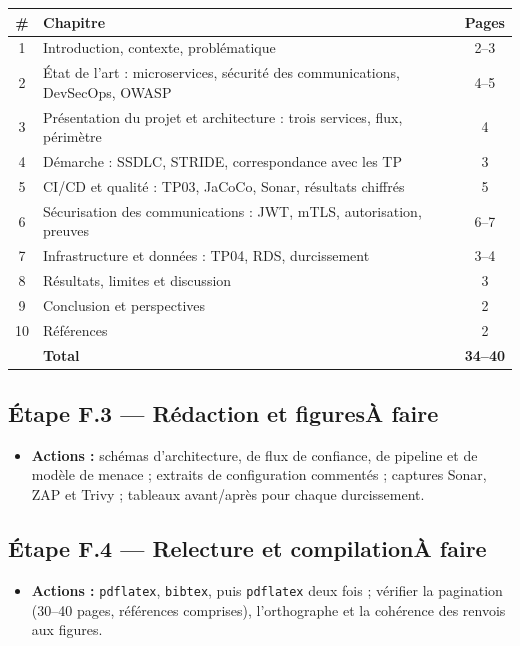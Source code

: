 \documentclass[12pt,a4paper]{article}
\newcommand{\code}[1]{\texttt{\small #1}}
\newcommand{\fait}{\hfill\textcolor{green!45!black}{\small\textbf{Fait}}}
\newcommand{\afaire}{\hfill\textcolor{orange!80!black}{\small\textbf{\`A faire}}}
\newcommand{\etape}[2]{%
  \subsection*{#1\ifstrequal{#2}{f}{\fait}{\afaire}}%
}
\begin{document}
\begin{center}
\small
\begin{tabularx}{\textwidth}{@{}cXc@{}}
\toprule
\textbf{\#} & \textbf{Chapitre} & \textbf{Pages} \\
\midrule
1 & Introduction, contexte, probl\'ematique & 2--3 \\
2 & \'Etat de l'art : microservices, s\'ecurit\'e des communications, DevSecOps, OWASP & 4--5 \\
3 & Pr\'esentation du projet et architecture : trois services, flux, p\'erim\`etre & 4 \\
4 & D\'emarche : SSDLC, STRIDE, correspondance avec les TP & 3 \\
5 & CI/CD et qualit\'e : TP03, JaCoCo, Sonar, r\'esultats chiffr\'es & 5 \\
6 & S\'ecurisation des communications : JWT, mTLS, autorisation, preuves & 6--7 \\
7 & Infrastructure et donn\'ees : TP04, RDS, durcissement & 3--4 \\
8 & R\'esultats, limites et discussion & 3 \\
9 & Conclusion et perspectives & 2 \\
10 & R\'ef\'erences & 2 \\
\midrule
 & \textbf{Total} & \textbf{34--40} \\
\bottomrule
\end{tabularx}
\end{center}

\etape{\'Etape F.3 --- R\'edaction et figures}{a}
\begin{itemize}[leftmargin=1.4em,itemsep=0.1em]
  \item \textbf{Actions :} sch\'emas d'architecture, de flux de confiance, de pipeline et de
        mod\`ele de menace ; extraits de configuration comment\'es ; captures Sonar, ZAP et
        Trivy ; tableaux avant/apr\`es pour chaque durcissement.
\end{itemize}

\etape{\'Etape F.4 --- Relecture et compilation}{a}
\begin{itemize}[leftmargin=1.4em,itemsep=0.1em]
  \item \textbf{Actions :} \code{pdflatex}, \code{bibtex}, puis \code{pdflatex} deux fois ;
        v\'erifier la pagination (30--40 pages, r\'ef\'erences comprises), l'orthographe et la
        coh\'erence des renvois aux figures.
\end{itemize}

\end{document}
